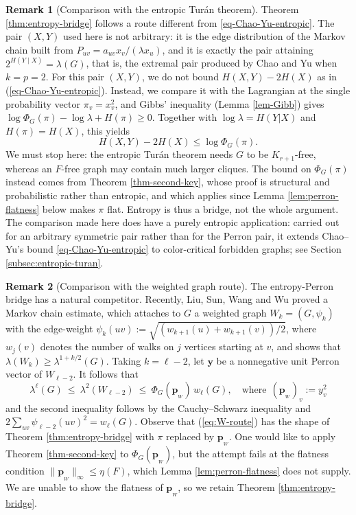 \documentclass[11pt, a4paper]{article}
\theoremstyle{definition}
\newtheorem{remark}{Remark}
\theoremstyle{plain}
\renewcommand{\le}{\leqslant}
\renewcommand{\ge}{\geqslant}
\newcommand{\PhiG}{\Phi_G}
\begin{document}
\begin{remark}[Comparison with the entropic Tur\'an theorem]
\label{rem:compare-CY}
Theorem \ref{thm:entropy-bridge} follows a route different from
\eqref{eq-Chao-Yu-entropic}. The pair $(X,Y)$ used here is not arbitrary: it is
the edge distribution of the Markov chain built from
$P_{uv}=a_{uv}x_v/(\lambda x_u)$, and it is exactly the pair attaining
$2^{H(Y\mid X)}=\lambda (G)$, that is, the extremal pair produced by Chao and Yu 
\cite[Proposition 5.4]{CY2026} when $k=p=2$.
For this pair $(X,Y)$, we do not bound
$H(X,Y)-2H(X)$ as in (\ref{eq-Chao-Yu-entropic}). 
Instead, we compare it with
the Lagrangian at the single probability vector $\pi_v=x_v^2$,
and Gibbs' inequality (Lemma \ref{lem-Gibb}) gives
$\log \Phi_G(\pi) - \log \lambda + H(\pi ) \ge 0. $ 
Together with $\log \lambda = H(Y|X)$ and
$H(\pi) = H(X)$, this yields
$$  {H(X,Y)-2H(X)}\le \log \PhiG(\pi).$$
We must stop here: the entropic Tur\'an theorem needs $G$ to be $K_{r+1}$-free,
whereas an $F$-free graph may contain much larger cliques. The bound on
$\PhiG(\pi )$ instead comes from Theorem \ref{thm-second-key}, whose proof is
structural and probabilistic rather than entropic, and which applies since Lemma \ref{lem:perron-flatness} below makes $\pi$ flat. Entropy is thus a
bridge, not the whole argument.  
The comparison made here does have a purely entropic application:
carried out for an arbitrary symmetric pair rather than for the Perron pair, it
extends Chao--Yu's bound \eqref{eq-Chao-Yu-entropic} to color-critical forbidden graphs; see
Section \ref{subsec:entropic-turan}. 
\end{remark}
 


\begin{remark}[Comparison with the weighted graph route]  \label{rem:not-replaceable}
The entropy-Perron bridge has a natural competitor. 
Recently, Liu, Sun, Wang and Wu
\cite{LSWW2026} proved a Markov chain estimate, which attaches to $G$ a weighted graph $W_k=(G,\psi_k)$ with the edge-weight $\psi_k(uv) :=\sqrt{(w_{k+1}(u)+w_{k+1}(v))/2}$, where $w_j(v)$ denotes the number of 
walks on $j$ vertices starting at $v$, and shows that 
$\lambda (W_k)\ge \lambda^{1+k/2}(G)$.  
Taking $k=\ell -2$, let $\bm{y}$ be a nonnegative unit Perron vector of $W_{\ell -2}$. It follows that 
\begin{equation}\label{eq:W-route}
  \lambda^{\ell}(G)\ \le\ \lambda^{2}(W_{\ell -2}) 
  \ \le\ \Phi_G(\bm{p}_{_{W}})\,w_\ell (G),\quad \text{where}~~ (\bm{p}_{_W})_v:=y_v^{2} 
\end{equation}
and the second inequality follows by the Cauchy--Schwarz inequality and $2\sum_{uv}\psi_{\ell -2}(uv)^{2}=w_\ell (G)$. 
Observe that (\ref{eq:W-route}) has the shape of Theorem \ref{thm:entropy-bridge} with $\pi$
replaced by $\bm{p}_{_W}$. 
One would like to apply Theorem \ref{thm-second-key} to
$\Phi_G(\bm{p}_{_W})$, but the attempt fails at the flatness condition $\lVert \bm{p}_{_W}\rVert_\infty \le \eta (F)$, which Lemma \ref{lem:perron-flatness} does not supply.  
We are unable to show the flatness of $\bm{p}_{_W}$, so we retain Theorem \ref{thm:entropy-bridge}.
 \end{remark}
\end{document}
